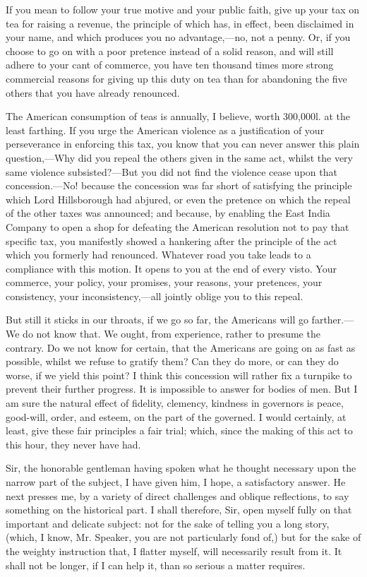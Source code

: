 If you mean to follow your true motive and your public faith, give up your tax on tea for raising a revenue, the principle of which has, in effect, been disclaimed in your name, and which produces you no advantage,—no, not a penny. Or, if you choose to go on with a poor pretence instead of a solid reason, and will still adhere to your cant of commerce, you have ten thousand times more strong commercial reasons for giving up this duty on tea than for abandoning the five others that you have already renounced.

The American consumption of teas is annually, I believe, worth 300,000l. at the least farthing. If you urge the American violence as a justification of your perseverance in enforcing this tax, you know that you can never answer this plain question,—Why did you repeal the others given in the same act, whilst the very same violence subsisted?—But you did not find the violence cease upon that concession.—No! because the concession was far short of satisfying the principle which Lord Hillsborough had abjured, or even the pretence on which the repeal of the other taxes was announced; and because, by enabling the East India Company to open a shop for defeating the American resolution not to pay that specific tax, you manifestly showed a hankering after the principle of the act which you formerly had renounced. Whatever road you take leads to a compliance with this motion. It opens to you at the end of every visto. Your commerce, your policy, your promises, your reasons, your pretences, your consistency, your inconsistency,—all jointly oblige you to this repeal.

But still it sticks in our throats, if we go so far, the Americans will go farther.—We do not know that. We ought, from experience, rather to presume the contrary. Do we not know for certain, that the Americans are going on as fast as possible, whilst we refuse to gratify them? Can they do more, or can they do worse, if we yield this point? I think this concession will rather fix a turnpike to prevent their further progress. It is impossible to answer for bodies of men. But I am sure the natural effect of fidelity, clemency, kindness in governors is peace, good-will, order, and esteem, on the part of the governed. I would certainly, at least, give these fair principles a fair trial; which, since the making of this act to this hour, they never have had.

Sir, the honorable gentleman having spoken what he thought necessary upon the narrow part of the subject, I have given him, I hope, a satisfactory answer. He next presses me, by a variety of direct challenges and oblique reflections, to say something on the historical part. I shall therefore, Sir, open myself fully on that important and delicate subject: not for the sake of telling you a long story, (which, I know, Mr. Speaker, you are not particularly fond of,) but for the sake of the weighty instruction that, I flatter myself, will necessarily result from it. It shall not be longer, if I can help it, than so serious a matter requires.

